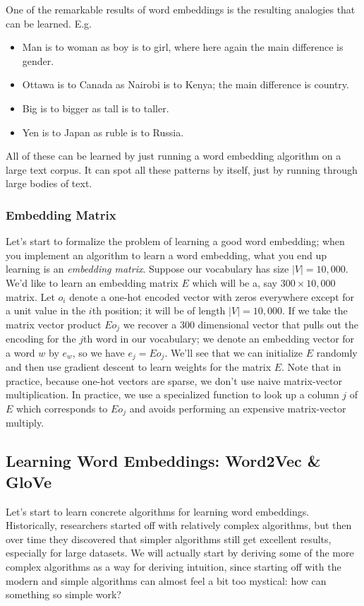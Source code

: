 \documentclass[12pt]{article}
\begin{document}
One of the remarkable results of word embeddings is the resulting analogies that can be learned. E.g.
\begin{itemize}
\item Man is to woman as boy is to girl, where here again the main difference is gender.
\item Ottawa is to Canada as Nairobi is to Kenya; the main difference is     country.
\item Big is to bigger as tall is to taller.
\item Yen is to Japan as ruble is to Russia.
\end{itemize}
All of these can be learned by just running a word embedding algorithm on a large text corpus. It can spot all these patterns by itself, just by running through large bodies of text.

\subsubsection{Embedding Matrix} Let's start to formalize the problem of learning a good word embedding; when you implement an algorithm to learn a word embedding, what you end up learning is an \emph{embedding matrix}. Suppose our vocabulary has size $|V| = 10,000$. We'd like to learn an embedding matrix $E$
which will be a, say $300 \times 10,000$ matrix. Let $o_{i}$ denote a one-hot encoded vector with zeros everywhere except for a unit value in the $i$th position; it will be of length $|V| = 10,000$. If we take the matrix vector product $E o_j$ we recover a $300$ dimensional vector that pulls out the encoding for the $j$th word in our vocabulary; we denote an embedding vector for a word $w$ by $e_w$, so we have $e_j = E o_j$. We'll see that we can initialize $E$ randomly and then use gradient descent to learn weights for the matrix $E$. Note that in practice, because one-hot vectors are sparse, we don't use naive matrix-vector multiplication. In practice, we use a specialized function to look up a column $j$ of $E$ which corresponds to $E o_j$ and avoids performing an expensive matrix-vector multiply.

\subsection{Learning Word Embeddings: Word2Vec \& GloVe}
Let's start to learn concrete algorithms for learning word embeddings. Historically, researchers started off with relatively complex algorithms, but then over time they discovered that simpler algorithms still get excellent results, especially for large datasets. We will actually start by deriving some of the more complex algorithms as a way for deriving intuition, since starting off with the modern and simple algorithms can almost feel a bit too mystical: how can something so simple work?
\end{document}
